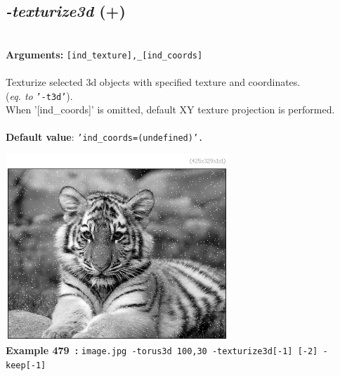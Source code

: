 \documentclass[a4paper,11pt,twoside]{book}
\begin{document}
\subsection{\emph{-texturize3d} (+)}\vspace*{-0.5em}
~\\\textbf{Arguments: } 
{\small \texttt{[ind\_texture],\_[ind\_coords]}}\\~\\
Texturize selected 3d objects with specified texture and coordinates.
~\\(\emph{eq. to} {\small \texttt{'-t3d'}}).
~\\When '[ind\_coords]' is omitted, default XY texture projection is performed.
~\\~\\\textbf{Default value}: {\small \texttt{'ind\_coords=(undefined)'.}}
\begin{center}\includegraphics[keepaspectratio=true,height=7cm,width=\textwidth]{img/gmic_def479.jpg}\\
{\footnotesize \textbf{Example 479~:} \texttt{image.jpg -torus3d 100,30 -texturize3d[-1] [-2] -keep[-1]}}
\end{center}
\end{document}
